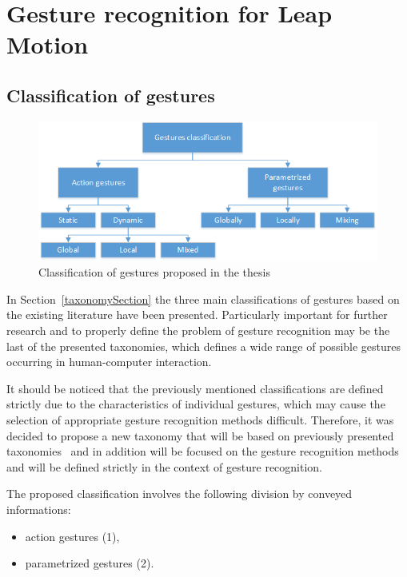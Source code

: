 \chapter{Gesture recognition for Leap Motion}\label{GestureRecChapter}

\section{Classification of gestures}\label{classificationSection}

\begin{figure}[htb]
\centering
 \includegraphics[width=0.8\columnwidth]{figures/gestureClassification.png}
 \caption[]{Classification of gestures proposed in the thesis}
 \label{thesisgesturetypes}
\end{figure}

In Section~\ref{taxonomySection} the three main classifications of gestures based on the existing literature have been presented. Particularly important for further research and to properly define the problem of gesture recognition may be the last of the presented taxonomies, which defines a wide range of possible gestures occurring in human-computer interaction.

It should be noticed that the previously mentioned classifications are defined strictly due to the characteristics of individual gestures, which may cause the selection of appropriate gesture recognition methods difficult. Therefore, it was decided to propose a new taxonomy that will be based on previously presented taxonomies~\cite{kammer_taxonomy_2010}\cite{Karam05ataxonomy}\cite{AignerTaxonomy} and in addition will be focused on the gesture recognition methods and will be defined strictly in the context of gesture recognition.

The proposed classification involves the following division by conveyed informations:
\begin{itemize}
\item action gestures (1),
\item parametrized gestures (2).
\end{itemize}

